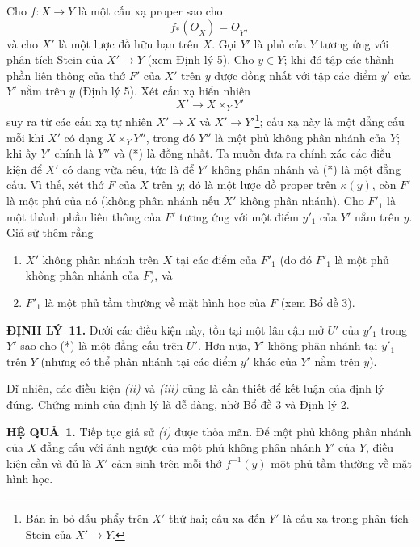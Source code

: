 \documentclass[11pt,twoside,openany]{book}
\numberwithin{equation}{section}
\newcommand{\src}[1]{%
  \phantomsection\hypertarget{src:\fgasourceid:#1}{}%
  \marginpar{\raggedleft\footnotesize\sffamily #1}%
}
\newcommand{\fgasourceid}{unset}
\newcommand{\Osh}{\underline{O}}
\newcommand{\result}[2]{\par\medskip\noindent\textbf{#1\if\relax\detokenize{#2}\relax\else\ #2\fi.}\quad}
\begin{document}
Cho $f:X\longrightarrow Y$ là một cấu xạ proper sao cho
\begin{equation}
  \tag{i}
  f_*(\Osh_X)=\Osh_Y,
\end{equation}
và cho $X'$ là một lược đồ hữu hạn trên $X$. Gọi $Y'$ là phủ của $Y$ tương ứng
với phân tích Stein của $X'\longrightarrow Y$ (xem Định lý 5). Cho $y\in Y$;
khi đó tập các thành phần liên thông của thớ $F'$ của $X'$ trên $y$ được đồng
nhất với tập các điểm $y'$ của $Y'$ nằm trên $y$ (Định lý 5). Xét cấu xạ hiển
nhiên
\begin{equation}
  \tag{*}
  X'\longrightarrow X\times_Y Y'
\end{equation}
suy ra từ các cấu xạ tự nhiên $X'\longrightarrow X$ và
$X'\longrightarrow Y'$\footnote{Bản in bỏ dấu phẩy trên $X'$ thứ hai; cấu xạ
đến $Y'$ là cấu xạ trong phân tích Stein của $X'\to Y$.}; cấu xạ này là một
đẳng cấu mỗi khi $X'$ có dạng $X\times_Y Y''$, trong đó $Y''$ là một phủ không
phân nhánh của $Y$; khi ấy $Y'$ chính là $Y''$ và (*) là đồng nhất. Ta muốn
đưa ra chính xác các điều kiện để $X'$ có dạng vừa nêu, tức là để $Y'$ không
phân nhánh và (*) là một đẳng cấu. Vì thế, xét thớ $F$ của $X$ trên $y$; đó là
một lược đồ proper trên $\kappa(y)$, còn $F'$ là một phủ của nó (không phân
nhánh nếu $X'$ không phân nhánh). Cho $F'_1$ là một thành phần liên thông của
$F'$ tương ứng với một điểm $y'_1$ của $Y'$ nằm trên $y$. Giả sử thêm rằng
\begin{enumerate}
  \item[\textit{(ii)}] $X'$ không phân nhánh trên $X$ tại các điểm của $F'_1$
    (do đó $F'_1$ là một phủ không phân nhánh của $F$), và
  \item[\textit{(iii)}] $F'_1$ là một phủ tầm thường về mặt hình học của $F$
    (xem Bổ đề 3).
\end{enumerate}

\result{ĐỊNH LÝ}{11} Dưới các điều kiện này, tồn tại một lân cận mở $U'$ của
$y'_1$ trong $Y'$ sao cho (*) là một đẳng cấu trên $U'$. Hơn nữa, $Y'$ không
phân nhánh tại $y'_1$ trên $Y$ (nhưng có thể phân nhánh tại các điểm $y'$ khác
của $Y'$ nằm trên $y$).

Dĩ nhiên, các điều kiện \textit{(ii)} và \textit{(iii)} cũng là cần thiết để
kết luận của định lý đúng. Chứng minh của định lý là dễ dàng, nhờ Bổ đề 3 và
Định lý 2.


\src{214}
\result{HỆ QUẢ}{1} Tiếp tục giả sử \textit{(i)} được thỏa mãn. Để một phủ
không phân nhánh của $X$ đẳng cấu với ảnh ngược của một phủ không phân
nhánh $Y'$ của $Y$, điều kiện cần và đủ là $X'$ cảm sinh trên mỗi thớ
$f^{-1}(y)$ một phủ tầm thường về mặt hình học.
\end{document}
